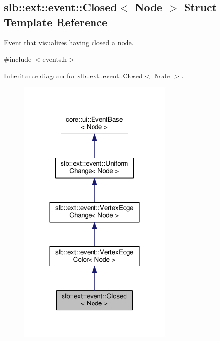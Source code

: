 \hypertarget{structslb_1_1ext_1_1event_1_1Closed}{}\subsection{slb\+:\+:ext\+:\+:event\+:\+:Closed$<$ Node $>$ Struct Template Reference}
\label{structslb_1_1ext_1_1event_1_1Closed}


Event that visualizes having closed a node.  




{\ttfamily \#include $<$events.\+h$>$}



Inheritance diagram for slb\+:\+:ext\+:\+:event\+:\+:Closed$<$ Node $>$\+:\nopagebreak
\begin{figure}[H]
\begin{center}
\leavevmode
\includegraphics[width=216pt]{structslb_1_1ext_1_1event_1_1Closed__inherit__graph}
\end{center}
\end{figure}


